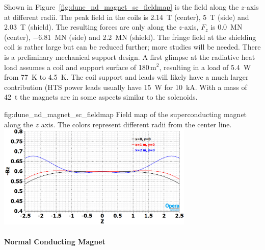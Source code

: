 %
Shown in Figure~\ref{fig:dune_nd_magnet_sc_fieldmap} is the field along the $z$-axis at different radii. The peak field in the coils is \SI{2.14}{T} (center), \SI{5}{T} (side) and \SI{2.03}{T} (shield). The resulting forces are only along the $z$-axis, $F_{z}$ is \SI{0.0}{MN} (center), \SI{-6.81}{MN} (side) and \SI{2.2}{MN} (shield). The fringe field at the shielding coil is rather large but can be reduced further; more studies will be needed. There is a preliminary mechanical support design. A first glimpse at the radiative heat load assumes a coil and support surface of 180\,m$^{2}$, resulting in a load of \SI{5.4}{W} from \SI{77}{K} to \SI{4.5}{K}. The coil support and leads will likely have a much larger contribution (HTS power leads usually have \SI{15}{W} for \SI{10}{kA}. With a mass of \SI{42}{t} the magnets are in some aspects similar to the  solenoids.
%
\begin{dunefigure}{fig:dune_nd_magnet_sc_fieldmap}
{Field map of the superconducting magnet along the $z$ axis. The colors represent different radii from the center line.}
\includegraphics[width=0.70\textwidth]{graphics/dune_nd_magnet_sc_fieldmap.png} 
\end{dunefigure}
%
%
\paragraph{Normal Conducting Magnet}

